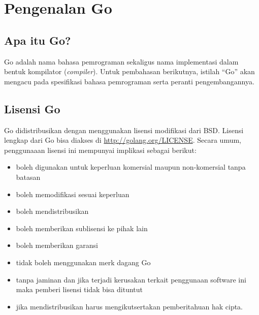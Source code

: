 \chapter{Pengenalan Go}

\section{Apa itu Go?}

Go adalah nama bahasa pemrograman sekaligus nama implementasi dalam bentuk kompilator (\textit{compiler}). Untuk pembahasan berikutnya, istilah ``Go'' akan mengacu pada spesifikasi bahasa pemrograman serta peranti pengembangannya.

\section{Lisensi Go}

Go didistribusikan dengan menggunakan lisensi modifikasi dari BSD. Lisensi lengkap dari Go bisa diakses di \url{http://golang.org/LICENSE}. Secara umum, penggunaaan lisensi ini mempunyai implikasi sebagai berikut:
\begin{itemize}
\item boleh digunakan untuk keperluan komersial maupun non-komersial tanpa batasan
\item boleh memodifikasi sesuai keperluan
\item boleh mendistribusikan
\item boleh memberikan sublisensi ke pihak lain
\item boleh memberikan garansi
\item tidak boleh menggunakan merk dagang Go
\item tanpa jaminan dan jika terjadi kerusakan terkait penggunaan software ini maka pemberi lisensi tidak bisa dituntut
\item jika mendistribusikan harus mengikutsertakan pemberitahuan hak cipta.
\end{itemize}

\lstset{language=Go, caption=hello.go}

